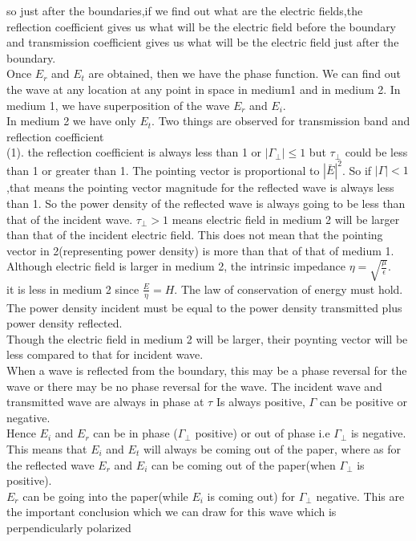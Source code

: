 so just after the boundaries,if we find out what are the electric fields,the reflection coefficient gives us what will be the electric field before the boundary  and transmission  coefficient  gives us what  will be the electric field just after  the boundary.\\
Once $E_{r}$ and $E_{t}$ are obtained, then we have the phase function. We can find out the wave at any location at any point in space in medium1 and in medium 2. In medium  1, we have superposition  of the wave $E_{r}$ and $E_{i}$.\\
In medium 2 we have only $E_{t}$. Two things are observed for transmission band and reflection  coefficient\\
(1). the reflection coefficient is always  less than 1 or $|\Gamma_{\bot}| \leq 1$ but $\tau_{\bot}$ could be less than 1 or greater than 1. The pointing vector is proportional  to $|\bar{E}|^{2}$. So if $|\Gamma|< 1$,that means the pointing vector magnitude  for the reflected  wave is always  less  than  1. So the power density of the reflected wave is always  going  to be less than that of the incident wave.  $\tau_{\bot} > 1$ means electric field in medium 2 will be larger than that of the incident electric field. This does not mean that the pointing vector in 2(representing power density) is more than that of that of medium 1.\\
Although electric field is larger in medium 2, the intrinsic impedance $\eta=\sqrt{\frac{\mu}{\epsilon}}$.\\
it is less in medium 2 since $\frac{E}{\eta} =H$. The law of conservation of energy must hold. The power density incident must be equal to the power density transmitted plus power density reflected.\\
Though the electric field in medium 2 will be larger, their poynting vector will be less compared to that for incident wave.\\
When a wave is reflected from the boundary, this may be a phase reversal for the wave or there may be no phase reversal for the wave. The incident  wave and transmitted  wave are always  in phase at $\tau$ Is always  positive, $\Gamma$ can be positive or negative.\\ 
Hence $E_{i}$ and $E_{r}$ can be in phase ($\Gamma_{\perp}$ positive) or out of phase i.e $\Gamma_{\perp}$ is negative. This  means that $E_{i}$ and $E_{t}$ will  always be coming out of the paper, where as for the reflected wave $E_{r}$ and $E_{i}$ can be coming out of the paper(when $\Gamma_{\perp}$ is positive).\\
 $E_{r}$ can be going into the paper(while $E_{i}$ is coming out) for $\Gamma_{\perp}$ negative. This are the important conclusion which we can draw for this wave which is perpendicularly polarized

